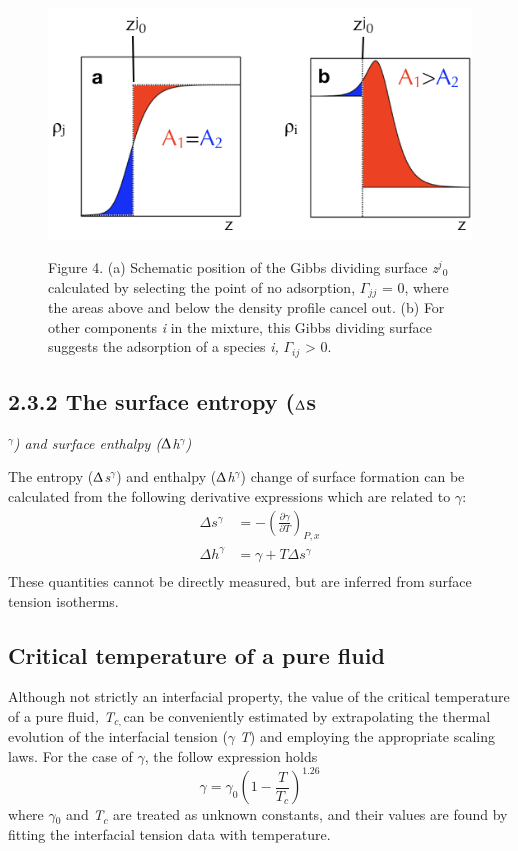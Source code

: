 \documentclass{scrbook}
\begin{document}
\begin{figure}
\caption{Figure 4. (a) Schematic position of the Gibbs dividing surface \textit{z}$^{j}$$_{0 }$calculated by selecting the point of no adsorption, ${\Gamma}$$_{jj}$ = 0, where the areas above and below the density profile cancel out. (b) For other components \textit{i}  in the mixture, this Gibbs dividing surface suggests the adsorption of a species \textit{i,} ${\Gamma}$$_{ij}$ {\textgreater} 0.}
\includegraphics[width=1\textwidth]{gfx/image11.png}
\label{fig:3}
\end{figure}

\subsection{2.3.2 The surface entropy (${\Updelta}$s}$^{{\gamma}}$\textit{) and surface enthalpy (${\Updelta}$h}$^{{\gamma}}$\textit{)}

The entropy (${\Updelta}$\textit{s}$^{{\gamma}}$) and enthalpy
(${\Updelta}$\textit{h}$^{{\gamma}}$) change of surface formation can be
calculated from the following derivative expressions which are related to
{${\gamma}$}\citep{evans1992}: 
\begin{align}
  \Delta s^{\gamma} &=-\left(\frac{\partial\gamma}{\partial T}\right)_{P,x} \\
  \Delta h^{\gamma} &=\gamma+T\Delta s^{\gamma} \\
\end{align}
These quantities cannot be directly measured, but are inferred from surface tension isotherms.

\subsection{Critical temperature of a pure fluid}

Although not strictly an interfacial property, the value of the critical
temperature of a pure fluid\textit{, T}$_{c, }$can be conveniently estimated by
extrapolating the thermal evolution of the interfacial tension (${\gamma}$
\textendash{} \textit{T}) and employing the appropriate scaling laws. For the
case of ${\gamma}$, the follow expression holds\citep{evans1992}
\begin{equation}
\gamma=\gamma_{0}\left(1-\frac{T}{T_{c}}\right)^{1.26}
\end{equation}
where ${\gamma}$$_{0}$ and \textit{T}$_{c}$ are treated as unknown constants,
and their values are found by fitting the interfacial tension data with
temperature.
\end{document}
